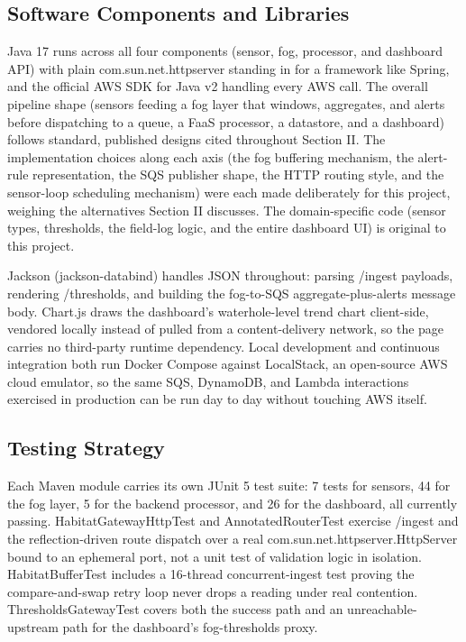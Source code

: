 \documentclass[conference,a4paper]{IEEEtran}
\begin{document}
\subsection{Software Components and Libraries}

Java 17 runs across all four components (sensor, fog, processor, and dashboard API) with plain com.sun.net.httpserver standing in for a framework like Spring, and the official AWS SDK for Java v2 handling every AWS call. The overall pipeline shape (sensors feeding a fog layer that windows, aggregates, and alerts before dispatching to a queue, a FaaS processor, a datastore, and a dashboard) follows standard, published designs cited throughout Section II. The implementation choices along each axis (the fog buffering mechanism, the alert-rule representation, the SQS publisher shape, the HTTP routing style, and the sensor-loop scheduling mechanism) were each made deliberately for this project, weighing the alternatives Section II discusses. The domain-specific code (sensor types, thresholds, the field-log logic, and the entire dashboard UI) is original to this project.

Jackson (jackson-databind) handles JSON throughout: parsing /ingest payloads, rendering /thresholds, and building the fog-to-SQS aggregate-plus-alerts message body. Chart.js draws the dashboard's waterhole-level trend chart client-side, vendored locally instead of pulled from a content-delivery network, so the page carries no third-party runtime dependency. Local development and continuous integration both run Docker Compose against LocalStack, an open-source AWS cloud emulator, so the same SQS, DynamoDB, and Lambda interactions exercised in production can be run day to day without touching AWS itself.

\subsection{Testing Strategy}

Each Maven module carries its own JUnit 5 test suite: 7 tests for sensors, 44 for the fog layer, 5 for the backend processor, and 26 for the dashboard, all currently passing. HabitatGatewayHttpTest and AnnotatedRouterTest exercise /ingest and the reflection-driven route dispatch over a real com.sun.net.httpserver.HttpServer bound to an ephemeral port, not a unit test of validation logic in isolation. HabitatBufferTest includes a 16-thread concurrent-ingest test proving the compare-and-swap retry loop never drops a reading under real contention. ThresholdsGatewayTest covers both the success path and an unreachable-upstream path for the dashboard's fog-thresholds proxy.
\end{document}
